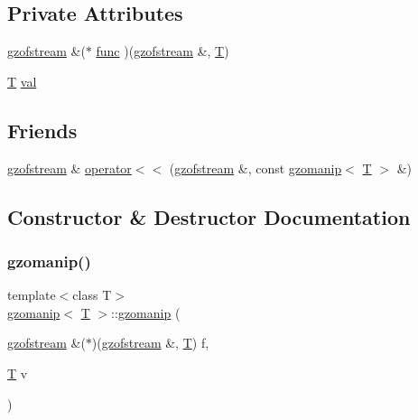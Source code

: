 \subsection*{Private Attributes}
\begin{DoxyCompactItemize}
\item 
\mbox{\hyperlink{classgzofstream}{gzofstream}} \&($\ast$ \mbox{\hyperlink{classgzomanip_acab3baeb360166d1af5ecf0345c15280}{func}} )(\mbox{\hyperlink{classgzofstream}{gzofstream}} \&, \mbox{\hyperlink{_aes_8c_af6f2f773ebe19973d2b24c1b959affe6}{T}})
\item 
\mbox{\hyperlink{_aes_8c_af6f2f773ebe19973d2b24c1b959affe6}{T}} \mbox{\hyperlink{classgzomanip_aaf32d81ce390ca216d9c5df35cbc66d5}{val}}
\end{DoxyCompactItemize}
\subsection*{Friends}
\begin{DoxyCompactItemize}
\item 
\mbox{\hyperlink{classgzofstream}{gzofstream}} \& \mbox{\hyperlink{classgzomanip_ace1e67eb789a4d1577a12cfcf782f22e}{operator$<$$<$}} (\mbox{\hyperlink{classgzofstream}{gzofstream}} \&, const \mbox{\hyperlink{classgzomanip}{gzomanip}}$<$ \mbox{\hyperlink{_aes_8c_af6f2f773ebe19973d2b24c1b959affe6}{T}} $>$ \&)
\end{DoxyCompactItemize}


\subsection{Constructor \& Destructor Documentation}
\mbox{\label{classgzomanip_a62e624a4096f8d543472895936b80c13}} 
\subsubsection{\texorpdfstring{gzomanip()}{gzomanip()}}
{\footnotesize\ttfamily template$<$class T$>$ \\
\mbox{\hyperlink{classgzomanip}{gzomanip}}$<$ \mbox{\hyperlink{_aes_8c_af6f2f773ebe19973d2b24c1b959affe6}{T}} $>$\+::\mbox{\hyperlink{classgzomanip}{gzomanip}} (\begin{DoxyParamCaption}\item[{\mbox{\hyperlink{classgzofstream}{gzofstream}} \&($\ast$)(\mbox{\hyperlink{classgzofstream}{gzofstream}} \&, \mbox{\hyperlink{_aes_8c_af6f2f773ebe19973d2b24c1b959affe6}{T}})}]{f,  }\item[{\mbox{\hyperlink{_aes_8c_af6f2f773ebe19973d2b24c1b959affe6}{T}}}]{v }\end{DoxyParamCaption})\hspace{0.3cm}{\ttfamily [inline]}}




